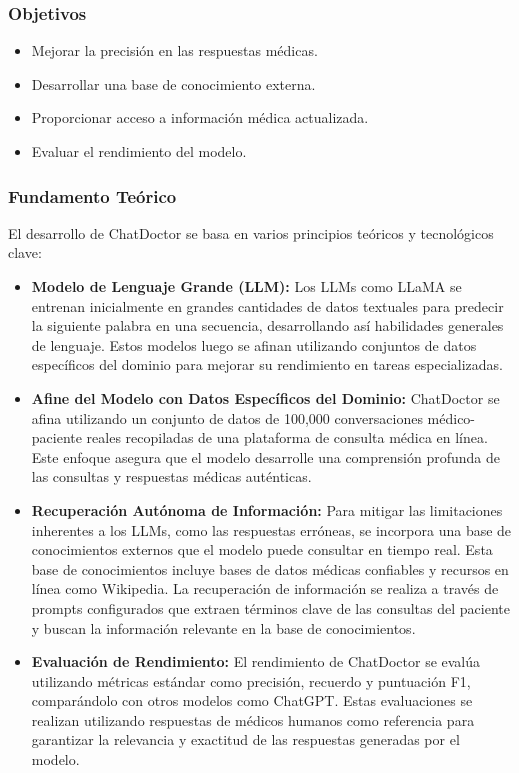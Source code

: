 \subsubsection{Objetivos}
	\begin{itemize}
		\item Mejorar la precisión en las respuestas médicas.
		\item Desarrollar una base de conocimiento externa.
		\item Proporcionar acceso a información médica actualizada.
		\item Evaluar el rendimiento del modelo.
	\end{itemize}	


\subsubsection{Fundamento Teórico}
El desarrollo de ChatDoctor se basa en varios principios teóricos y tecnológicos clave:

	\begin{itemize}
		\item \textbf{Modelo de Lenguaje Grande (LLM):} Los LLMs como LLaMA se entrenan inicialmente en grandes cantidades de datos textuales para predecir la siguiente palabra en una secuencia, desarrollando así habilidades generales de lenguaje. Estos modelos luego se afinan utilizando conjuntos de datos específicos del dominio para mejorar su rendimiento en tareas especializadas.
		
		\item \textbf{Afine del Modelo con Datos Específicos del Dominio:} ChatDoctor se afina utilizando un conjunto de datos de 100,000 conversaciones médico-paciente reales recopiladas de una plataforma de consulta médica en línea. Este enfoque asegura que el modelo desarrolle una comprensión profunda de las consultas y respuestas médicas auténticas.
		
		\item \textbf{Recuperación Autónoma de Información:} Para mitigar las limitaciones inherentes a los LLMs, como las respuestas erróneas, se incorpora una base de conocimientos externos que el modelo puede consultar en tiempo real. Esta base de conocimientos incluye bases de datos médicas confiables y recursos en línea como Wikipedia. La recuperación de información se realiza a través de prompts configurados que extraen términos clave de las consultas del paciente y buscan la información relevante en la base de conocimientos.
		
		\item \textbf{Evaluación de Rendimiento:} El rendimiento de ChatDoctor se evalúa utilizando métricas estándar como precisión, recuerdo y puntuación F1, comparándolo con otros modelos como ChatGPT. Estas evaluaciones se realizan utilizando respuestas de médicos humanos como referencia para garantizar la relevancia y exactitud de las respuestas generadas por el modelo.
	\end{itemize}

